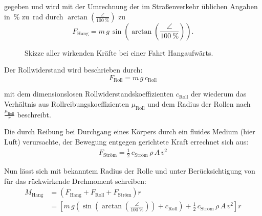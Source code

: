 	gegeben und wird mit der Umrechnung der im Straßenverkehr üblichen Angaben in~\unit{\percent} zu~\unit{\radian} durch \(\arctan\!\left(\frac{\angle}{\qty{100}{\percent}}\right)\) zu
	\begin{equation}
		F_\text{Hang} = m \, g \, \sin\!\left(\arctan\!\left(\frac{\angle}{\qty{100}{\percent}}\right)\right).%
		\label{eq:downhill force incline to radian}
	\end{equation}
	\begin{figure}[h]
		\centering
		
		\caption[Skizze aller wirkenden Kräfte bei einer Fahrt Hangaufwärts]{Skizze aller wirkenden Kräfte bei einer Fahrt Hangaufwärts.}%
		\label{fig:sketch torque incline}
	\end{figure}

	Der Rollwiderstand wird beschrieben durch:
	\begin{equation}
		F_\text{Roll} = m \, g \, c_\text{Roll}
		\label{eq:rolling resistance}
	\end{equation}%
	
	mit dem dimensionslosen Rollwiderstandskoeffizienten \(c_\text{Roll}\) der wiederum das Verhältnis aus Rollreibungskoeffizienten \(\mu_\text{Roll}\) und dem Radius der Rollen nach \(\frac{\mu_\text{Roll}}{r}\) beschreibt.\par\medskip
	Die durch Reibung bei Durchgang eines Körpers durch ein fluides Medium (hier Luft) verursachte, der Bewegung entgegen gerichtete Kraft errechnet sich aus:
	\begin{align}
		F_\text{Ström} = \frac{1}{2} \, c_\text{Ström} \, \rho \, A \, v^2
		\label{eq:air drag}
	\end{align}%

	Nun lässt sich mit bekanntem Radius der Rolle und unter Berücksichtigung von  für das rückwirkende Drehmoment schreiben:
	\begin{align}
		M_\text{Hang}	&= \left(F_\text{Hang} + F_\text{Roll} + F_\text{Ström}\right) r \nonumber \\
						&= \left[ m \, g \left( \sin\!\left(\arctan\!\left(\frac{\angle}{\qty{100}{\percent}}\right)\right) + c_\text{Roll} \right) + \frac{1}{2} \, c_\text{Ström} \, \rho \, A \, v^2 \right] r%
		\label{eq:incline plus roll plus drag torque}
	\end{align}%
